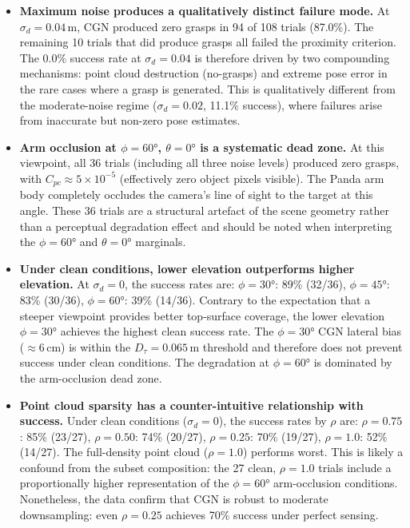 \documentclass[11pt,a4paper]{report}
\begin{document}
\begin{itemize}
  \item \textbf{Maximum noise produces a qualitatively distinct failure mode.} At $\sigma_d = 0.04$\,m, CGN produced zero grasps in 94 of 108 trials (87.0\%). The remaining 10 trials that did produce grasps all failed the proximity criterion. The 0.0\% success rate at $\sigma_d = 0.04$ is therefore driven by two compounding mechanisms: point cloud destruction (no-grasps) and extreme pose error in the rare cases where a grasp is generated. This is qualitatively different from the moderate-noise regime ($\sigma_d = 0.02$, 11.1\% success), where failures arise from inaccurate but non-zero pose estimates.

  \item \textbf{Arm occlusion at $\phi = 60°$, $\theta = 0°$ is a systematic dead zone.} At this viewpoint, all 36 trials (including all three noise levels) produced zero grasps, with $C_{pc} \approx 5 \times 10^{-5}$ (effectively zero object pixels visible). The Panda arm body completely occludes the camera's line of sight to the target at this angle. These 36 trials are a structural artefact of the scene geometry rather than a perceptual degradation effect and should be noted when interpreting the $\phi = 60°$ and $\theta = 0°$ marginals.

  \item \textbf{Under clean conditions, lower elevation outperforms higher elevation.} At $\sigma_d = 0$, the success rates are: $\phi = 30°$: 89\% (32/36), $\phi = 45°$: 83\% (30/36), $\phi = 60°$: 39\% (14/36). Contrary to the expectation that a steeper viewpoint provides better top-surface coverage, the lower elevation $\phi = 30°$ achieves the highest clean success rate. The $\phi = 30°$ CGN lateral bias ($\approx$6\,cm) is within the $D_\tau = 0.065$\,m threshold and therefore does not prevent success under clean conditions. The degradation at $\phi = 60°$ is dominated by the arm-occlusion dead zone.

  \item \textbf{Point cloud sparsity has a counter-intuitive relationship with success.} Under clean conditions ($\sigma_d = 0$), the success rates by $\rho$ are: $\rho = 0.75$: 85\% (23/27), $\rho = 0.50$: 74\% (20/27), $\rho = 0.25$: 70\% (19/27), $\rho = 1.0$: 52\% (14/27). The full-density point cloud ($\rho = 1.0$) performs worst. This is likely a confound from the subset composition: the 27 clean, $\rho = 1.0$ trials include a proportionally higher representation of the $\phi = 60°$ arm-occlusion conditions. Nonetheless, the data confirm that CGN is robust to moderate downsampling: even $\rho = 0.25$ achieves 70\% success under perfect sensing.
\end{itemize}
\end{document}
